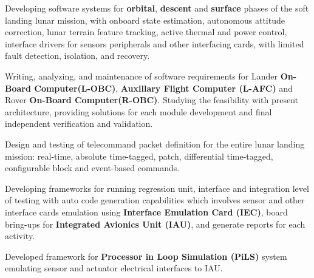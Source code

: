 \begin{cventries}
{\begin{cvitems}
			\item{\large Developing software systems for \textbf{orbital}, \textbf{descent} and \textbf{surface} phases of the soft landing lunar mission, with onboard state estimation, autonomous attitude correction, lunar terrain feature tracking, active thermal and power control, interface drivers for sensors peripherals and other interfacing cards, with limited fault detection, isolation, and recovery.}
			\item{\large Writing, analyzing, and maintenance of software requirements for Lander \textbf{On-Board Computer(L-OBC)}, \textbf{Auxillary Flight Computer (L-AFC)} and Rover \textbf{On-Board Computer(R-OBC)}. Studying the feasibility with present architecture, providing solutions for each module development and final independent verification and validation.}
			\item{\large Design and testing of telecommand packet definition for the entire lunar landing mission: real-time, absolute time-tagged, patch, differential time-tagged, configurable block and event-based commands.}
			\item{\large Developing frameworks for running regression unit, interface and integration level of testing with auto code generation capabilities which involves sensor and other interface cards emulation using \textbf{Interface Emulation Card (IEC)}\href{http://zedboard.org/product/microzed/}, board bring-ups for \textbf{Integrated Avionics Unit (IAU)}, and generate reports for each activity.}
			\item{\large Developed framework for \textbf{Processor in Loop Simulation (PiLS)} system emulating sensor and actuator electrical interfaces to IAU.}

\end{cvitems}}
\end{cventries}
